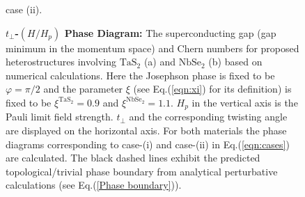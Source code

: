 \begin{figure}[!htp]
\begin{minipage}{1.0\textwidth}
\begin{minipage}{0.45\textwidth}
            case (ii).\\
        \end{minipage}
    \end{minipage}
    \caption{{\bf $t_\perp$-$(H/H_p)$ Phase Diagram:} The superconducting gap (gap minimum in the momentum space) and Chern numbers for proposed heterostructures involving $\mathrm{TaS_2}$ (a) and $\mathrm{NbSe_2}$ (b) based on numerical calculations. Here the Josephson phase is fixed to be $\varphi=\pi/2$ and the parameter $\xi$ (see Eq.(\ref{eqn:xi}) for its definition) is fixed to be $\xi^{\mathrm{TaS_2}}=0.9$ and $\xi^{\mathrm{NbSe_2}}=1.1$. $H_p$ in the vertical axis is the Pauli limit field strength. $t_\perp$ and the corresponding twisting angle are displayed on the horizontal axis. For both materials the phase diagrams corresponding to case-(i) and case-(ii) in Eq.(\ref{eqn:cases}) are calculated. The black dashed lines exhibit the predicted topological/trivial phase boundary from analytical perturbative calculations (see Eq.(\ref{Phase boundary})).}
    \label{fig:t-H phase digram}
\end{figure}


